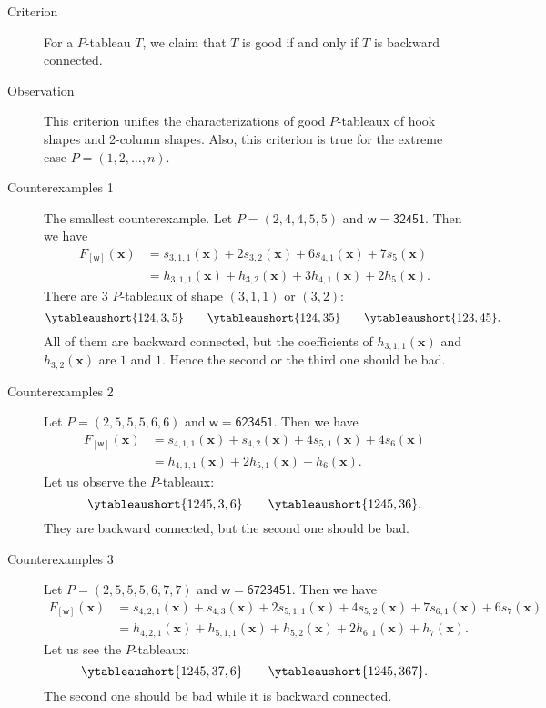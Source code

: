 \documentclass[12pt,a4paper,reqno]{amsart}
\theoremstyle{definition}
\theoremstyle{remark}
\newcommand\xx{\mathbf{x}}
\newcommand\ww{\mathsf{w}}
\begin{document}
\begin{description}
  \item[Criterion] For a \( P \)-tableau \( T \), we claim that \( T \) is good if and only if
  \( T \) is backward connected.
  \item[Observation] This criterion unifies the characterizations of good \( P \)-tableaux of
  hook shapes and 2-column shapes. Also, this criterion is true for the extreme case \( P=(1,2,\dots,n) \).
  \item[Counterexamples 1] The smallest counterexample.
  Let \( P=(2,4,4,5,5) \) and \( \ww=\mathsf{32451} \). Then we have
  \begin{align*}
    F_{[\ww]}(\xx)
      &= s_{3,1,1}(\xx) + 2 s_{3,2}(\xx) + 6 s_{4,1}(\xx) + 7 s_{5}(\xx) \\
      &= h_{3,1,1}(\xx) + h_{3,2}(\xx) + 3 h_{4,1}(\xx) + 2 h_{5}(\xx).
  \end{align*}
  There are 3 \( P \)-tableaux of shape \( (3,1,1) \) or \( (3,2) \):
  \[
    \ytableaushort{124,3,5} \qquad \ytableaushort{124,35} \qquad \ytableaushort{123,45}.
  \]
  All of them are backward connected, but the coefficients of \( h_{3,1,1}(\xx) \) and \( h_{3,2}(\xx)
  \) are \( 1 \) and \( 1 \). Hence the second or the third one should be bad.
  \item[Counterexamples 2] Let \( P=(2,5,5,5,6,6) \) and \( \ww=\mathsf{623451} \).
  Then we have
  \begin{align*}
    F_{[\ww]}(\xx)
      &= s_{4,1,1}(\xx) + s_{4,2}(\xx) + 4 s_{5,1}(\xx) + 4 s_{6}(\xx) \\
      &= h_{4,1,1}(\xx) + 2 h_{5,1}(\xx) + h_{6}(\xx).
  \end{align*}
  Let us observe the \( P \)-tableaux:
  \[
    \ytableaushort{1245,3,6} \qquad \ytableaushort{1245,36}.
  \]
  They are backward connected, but the second one should be bad.
  \item[Counterexamples 3] Let \( P=(2, 5, 5, 5, 6, 7, 7) \) and \( \ww=\mathsf{6723451} \).
  Then we have
  \begin{align*}
    F_{[\ww]}(\xx)
      &= s_{4,2,1}(\xx) + s_{4,3}(\xx) + 2 s_{5,1,1}(\xx) + 4 s_{5,2}(\xx) + 7 s_{6,1}(\xx) + 6 s_{7}(\xx) \\
      &= h_{4,2,1}(\xx) + h_{5,1,1}(\xx) + h_{5,2}(\xx) + 2 h_{6,1}(\xx) + h_{7}(\xx).
  \end{align*}
  Let us see the \( P \)-tableaux:
  \[
    \ytableaushort{1245,37,6} \qquad \ytableaushort{1245,367}.
  \]
  The second one should be bad while it is backward connected.

\end{description}
\end{document}
